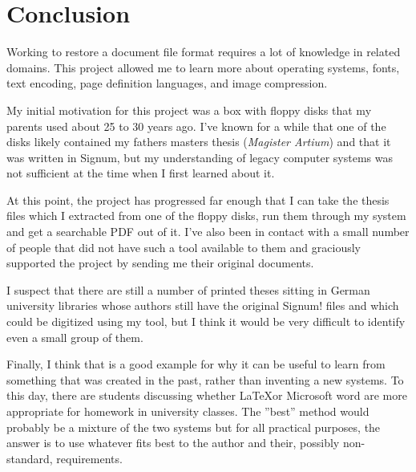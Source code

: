 \section*{Conclusion}
\label{sec:conclusion}

Working to restore a document file format requires a lot of knowledge in related domains. This project allowed me to learn more about operating systems, fonts, text encoding, page definition languages, and image compression.

My initial motivation for this project was a box with floppy disks that my parents used about 25 to 30 years ago. I've known for a while that one of the disks likely contained my fathers masters thesis (\textit{Magister Artium}) and that it was written in Signum, but my understanding of legacy computer systems was not sufficient at the time when I first learned about it.

At this point, the project has progressed far enough that I can take the thesis files which I extracted from one of the floppy disks, run them through my system and get a searchable PDF out of it. I've also been in contact with a small number of people that did not have such a tool available to them and graciously supported the project by sending me their original documents.

I suspect that there are still a number of printed theses sitting in German university libraries whose authors still have the original Signum! files and which could be digitized using my tool, but I think it would be very difficult to identify even a small group of them.


Finally, I think that \Signum{} is a good example for why it can be useful to learn from something that was created in the past, rather than inventing a new systems. To this day, there are students discussing whether \LaTeX or Microsoft word are more appropriate for homework in university classes. The ''best'' method would probably be a mixture of the two systems but for all practical purposes, the answer is to use whatever fits best to the author and their, possibly non-standard, requirements.


